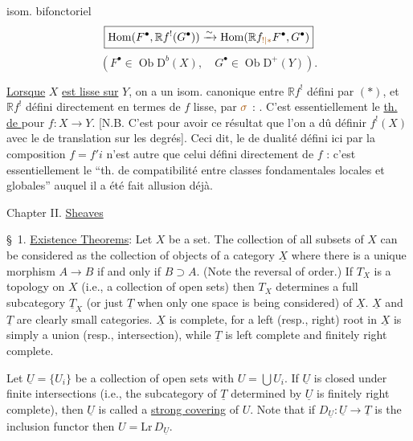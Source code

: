 isom. bifonctoriel
\[
\boxed{\operatorname{Hom}(F^\bullet,\mathbb{R}f^!(G^\bullet))
\xrightarrow{\sim}
\operatorname{Hom}(\mathbb{R}f_{\unsure{!|*}}F^\bullet,G^\bullet)}
\]
\[
(F^\bullet\in\operatorname{Ob}\mathrm D^b(X),\quad G^\bullet\in\operatorname{Ob}\mathrm D^+(Y)).
\]

\uline{Lorsque} $X$ \uline{est lisse sur} $Y$, on a un isom. canonique entre $\mathbb{R}f^!$ défini par $(*)$, et $\mathbb{R}f^!$ défini directement en termes de $f$ lisse,  par $\unsure{\sigma}$ : .
C'est essentiellement le \uline{th. de } pour $f:X\longrightarrow Y$.
[N.B. C'est pour avoir ce résultat que l'on a dû définir $f^!(X)$ avec le  de translation sur les degrés\unsure{\ldots}].
Ceci dit, le  de dualité défini ici par la composition $f=f'i$ n'est autre que celui défini directement   de $f$ : c'est essentiellement le ``th. de compatibilité entre classes fondamentales locales et globales'' auquel il a été fait allusion déjà.

Chapter II. \uline{Sheaves}

\S\ 1. \uline{Existence Theorems}: Let $X$ be a set. The collection of all subsets of $X$ can be considered as the collection of objects of a category $\underline X$ where there is a unique morphism $A\longrightarrow B$ if and only if $B\supset A$. (Note the reversal of order.) If $T_X$ is a topology on $X$ (i.e., a collection of open sets) then $T_X$ determines a full subcategory $\underline T_X$ (or just $\underline T$ when only one space is being considered) of $\underline X$. $\underline X$ and $\underline T$ are clearly small categories. $\underline X$ is complete, for a left (resp., right) root in $\underline X$ is simply a union (resp., intersection), while $\underline T$ is left complete and finitely right complete.

Let $\underline U=\{U_i\}$ be a collection of open sets with $U=\bigcup U_i$. If $\underline U$ is closed under finite intersections (i.e., the subcategory of $\underline T$ determined by $\underline U$ is finitely right complete), then $\underline U$ is called a \uline{strong covering} of $U$. Note that if $D_{\underline U}:\underline U\longrightarrow\underline T$ is the inclusion functor then $U=\mathrm{Lr}\,D_{\underline U}$.

